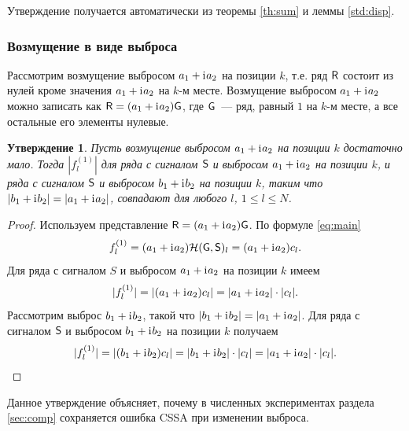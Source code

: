 \documentclass[specialist,
               substylefile = spbu.rtx,
               subf,href,colorlinks=true, 12pt]{disser}
\newtheorem{statement}{Утверждение}
\begin{document}
Утверждение получается автоматически из теоремы \ref{th:sum} и леммы \ref{std:disp}.

\subsubsection{Возмущение в виде выброса} \label{ss:RMSEinv}

Рассмотрим возмущение выбросом $a_1 + \mathrm{i}\mkern1mu a_2$ на позиции $k$, т.е. ряд $\textsf{R}$ состоит из нулей кроме значения $a_1 + \mathrm{i}\mkern1mu a_2$ на $k$-м месте.
Возмущение выбросом $a_1 + \mathrm{i}\mkern1mu a_2$ можно записать как  $\textsf{R} = (a_1 + \mathrm{i}\mkern1mu a_2)\textsf{G}$, где $\textsf{G}$~--- ряд, равный $1$ на $k$-м месте, а все остальные его элементы нулевые.

\begin{statement}\label{st:RMSEinv}
	Пусть возмущение выбросом $a_1 + \mathrm{i}\mkern1mu a_2$ на позиции $k$ достаточно мало.
	Тогда $|f_l^{(1)}|$ для ряда с сигналом $\textsf{S}$ и выбросом $a_1 + \mathrm{i}\mkern1mu a_2$ на позиции $k$, и  ряда с сигналом $\textsf{S}$ и выбросом $b_1 + \mathrm{i}\mkern1mu b_2$ на позиции $k$, таким что $|b_1 + \mathrm{i}\mkern1mu b_2| = |a_1 + \mathrm{i}\mkern1mu a_2|$, совпадают для любого $l$, $1\le l \le N$.
\end{statement}
\begin{proof}
	Используем представление $\textsf{R} = (a_1 + \mathrm{i}\mkern1mu a_2)\textsf{G}$.
	По формуле \eqref{eq:main}
	$$f^{(1)}_l = (a_1 + \mathrm{i}\mkern1mu a_2)\mathcal{H}(\textsf{G}, \textsf{S})_l = (a_1 + \mathrm{i}\mkern1mu a_2)c_l.$$
	Для ряда с сигналом $S$ и выбросом $a_1 + \mathrm{i}\mkern1mu a_2$ на позиции $k$ имеем
	$$|f^{(1)}_l| = |(a_1 + \mathrm{i}\mkern1mu a_2)c_l| = |a_1 + \mathrm{i}\mkern1mu a_2|\cdot|c_l|. $$
	Рассмотрим выброс $b_1 + \mathrm{i}\mkern1mu b_2$, такой что $|b_1 + \mathrm{i}\mkern1mu b_2| = |a_1 + \mathrm{i}\mkern1mu a_2|$.
	Для ряда с сигналом $\textsf{S}$ и выбросом $b_1 + \mathrm{i}\mkern1mu b_2$ на позиции $k$ получаем
	$$|f^{(1)}_l| = |(b_1 + \mathrm{i}\mkern1mu b_2)c_l| = |b_1 + \mathrm{i}\mkern1mu b_2|\cdot|c_l| = |a_1 + \mathrm{i}\mkern1mu a_2|\cdot|c_l|. $$
\end{proof}

Данное утверждение объясняет, почему в численных экспериментах раздела \ref{sec:comp} сохраняется ошибка CSSA при изменении выброса.
\end{document}
